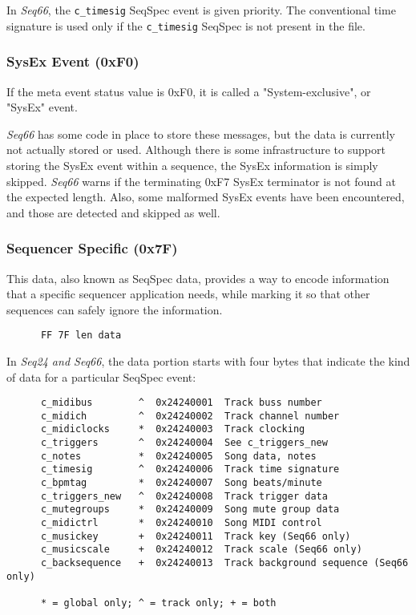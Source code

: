    In \textsl{Seq66},
   the \texttt{c\_timesig} SeqSpec event is given priority.  The
   conventional time signature is used only if the \texttt{c\_timesig}
   SeqSpec is not present in the file.

\subsubsection{SysEx Event (0xF0)}
\label{subsubsec:midi_format_meta_sysex_event}

   If the meta event status value is 0xF0, it is called a "System-exclusive",
   or "SysEx" event.

   \textsl{Seq66} has some code in place to store these messages, but the
   data is currently not actually stored or used.  Although there is some
   infrastructure to support storing the SysEx event within a sequence, the
   SysEx information is simply skipped.  \textsl{Seq66} warns if the
   terminating 0xF7 SysEx terminator is not found at the expected length.
   Also, some malformed SysEx events have been encountered, and those are
   detected and skipped as well.

\subsubsection{Sequencer Specific (0x7F)}
\label{subsubsec:midi_format_meta_sequencer_specific}

   This data, also known as SeqSpec data, provides a way to encode information
   that a specific sequencer application needs, while marking it so that other
   sequences can safely ignore the information.

   \begin{verbatim}
      FF 7F len data
   \end{verbatim}

   In \textsl{Seq24 and Seq66},
   the data portion starts with four bytes
   that indicate the kind of data for a particular SeqSpec event:

   \begin{verbatim}
      c_midibus        ^  0x24240001  Track buss number
      c_midich         ^  0x24240002  Track channel number
      c_midiclocks     *  0x24240003  Track clocking
      c_triggers       ^  0x24240004  See c_triggers_new
      c_notes          *  0x24240005  Song data, notes
      c_timesig        ^  0x24240006  Track time signature
      c_bpmtag         *  0x24240007  Song beats/minute
      c_triggers_new   ^  0x24240008  Track trigger data
      c_mutegroups     *  0x24240009  Song mute group data
      c_midictrl       *  0x24240010  Song MIDI control
      c_musickey       +  0x24240011  Track key (Seq66 only)
      c_musicscale     +  0x24240012  Track scale (Seq66 only)
      c_backsequence   +  0x24240013  Track background sequence (Seq66 only)

      * = global only; ^ = track only; + = both
   \end{verbatim}

